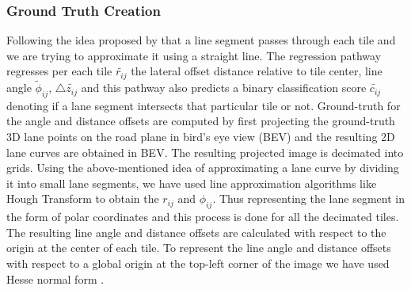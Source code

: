         \subsubsection{Ground Truth Creation}
        Following the idea proposed by \cite{DBLP:journals/corr/abs-2011-01535} that a line segment passes through each tile and we are trying to approximate it using a straight line. The regression pathway regresses per each tile $\widetilde{r_{ij}}$ the lateral offset distance relative to tile center, line angle $\widetilde{\phi}_{ij}$, $\triangle{\widetilde{z_{ij}}}$ and this pathway also predicts a binary classification score $\widetilde{c_{ij}}$ denoting if a lane segment intersects that particular tile or not. 
        Ground-truth for the angle and distance offsets are computed by first projecting the ground-truth 3D lane points on the road plane in bird's eye view (BEV) and the resulting 2D lane curves are obtained in BEV. The resulting projected image is decimated into grids. Using the above-mentioned idea of approximating a lane curve by dividing it into small lane segments, we have used line approximation algorithms like Hough Transform to obtain the $r_{ij}$ and $\phi_{ij}$. Thus representing the lane segment in the form of polar coordinates and this process is done for all the decimated tiles. The resulting line angle and distance offsets are calculated with respect to the origin at the center of each tile. To represent the line angle and distance offsets with respect to a global origin at the top-left corner of the image we have used Hesse normal form . 
        
